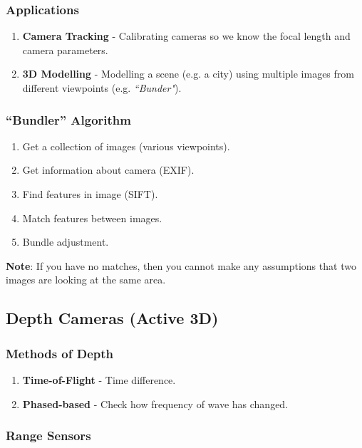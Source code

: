 \documentclass[english, 10pt]{article}
\begin{document}
\subsubsection{Applications}

\begin{enumerate}
\item \textbf{Camera Tracking} - Calibrating cameras so we know the focal length and camera parameters.
\item \textbf{3D Modelling} - Modelling a scene (e.g. a city) using multiple images from different viewpoints (e.g. \textit{``Bunder"}).
\end{enumerate}

\subsubsection{``Bundler'' Algorithm}

\begin{enumerate}
\item Get a collection of images (various viewpoints).
\item Get information about camera (EXIF).
\item Find features in image (SIFT).
\item Match features between images.
\item Bundle adjustment.
\end{enumerate}

\textbf{Note}: If you have no matches, then you cannot make any assumptions that two images are looking at the same area.

\subsection{Depth Cameras (Active 3D)}

\subsubsection{Methods of Depth}

\begin{enumerate}
\item \textbf{Time-of-Flight} - Time difference. 
\item \textbf{Phased-based} - Check how frequency of wave has changed.
\end{enumerate}

\subsubsection{Range Sensors}
\end{document}
